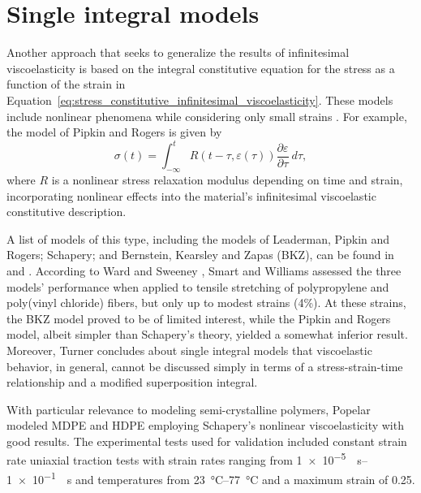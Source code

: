 \section{Single integral models}
Another approach that seeks to generalize the results of infinitesimal viscoelasticity is based on the integral constitutive equation for the stress as a function of the strain in Equation~\eqref{eq:stress_constitutive_infinitesimal_viscoelasticity}.
These models include nonlinear phenomena while considering only small strains \citep{wardIntroductionMechanicalProperties2004}.
For example, the model of Pipkin and Rogers is given by \citep{wardIntroductionMechanicalProperties2004}
\begin{equation}
	\sigma(t) = \int_{-\infty}^t R(t-\tau, \varepsilon(\tau))\frac{\partial \varepsilon}{\partial \tau}\ d\tau,
\end{equation}
where $R$ is a nonlinear stress relaxation modulus depending on time and strain, incorporating nonlinear effects into the material's infinitesimal viscoelastic constitutive description.

A list of models of this type, including the models of Leaderman, Pipkin and Rogers; Schapery; and Bernstein, Kearsley and Zapas (BKZ), can be found in \cite{wardIntroductionMechanicalProperties2004} and \cite{malkinRheologyConceptsMethods2017}.
According to Ward and Sweeney \citep{wardIntroductionMechanicalProperties2004}, Smart and Williams \citep{smartComparisonSingleintegralNonlinear1972} assessed the three models' performance when applied to tensile stretching of polypropylene and poly(vinyl chloride) fibers, but only up to modest strains (4\%).
At these strains, the BKZ model proved to be of limited interest, while the Pipkin and Rogers model, albeit simpler than Schapery's theory, yielded a somewhat inferior result.
Moreover, Turner \citep{turnerStrainResponsePlastics1966} concludes about single integral models that viscoelastic behavior, in general, cannot be discussed simply in terms of a stress-strain-time relationship and a modified superposition integral.

With particular relevance to modeling semi-crystalline polymers, Popelar \citep{popelarViscoelasticMaterialCharacterization1990} modeled MDPE and HDPE employing Schapery's nonlinear viscoelasticity with good results.
The experimental tests used for validation included constant strain rate uniaxial traction tests with strain rates ranging from \SIrange{1e-5}{1e-1}{\per\second} and temperatures from \SIrange{23}{77}{\celsius} and a maximum strain of 0.25.


